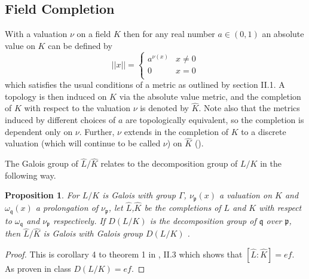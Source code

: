 \documentclass[paper=a4, fontsize=11pt]{scrartcl} %
\numberwithin{equation}{section} %
\numberwithin{figure}{section} %
\numberwithin{table}{section} %
\theoremstyle{break}
\newtheorem{prop}{Proposition}
\begin{document}
\subsection{Field Completion}
With a valuation $\nu$ on a field $K$ then for any real number $a\in(0,1)$ an absolute value on $K$ can be defined by
\[ ||x|| =  \begin{cases} 
      a^{\nu(x)} & x \not= 0 \\
      0 & x = 0 \\
   \end{cases}
\]
which satisfies the usual conditions of a metric as outlined by \cite{Serre} section II.1. A topology is then induced on $K$ via the absolute value metric, and the completion of $K$ with respect to the valuation $\nu$ is denoted by $\widehat{K}$. Note also that the metrics induced by different choices of $a$ are topologically equivalent, so the completion is dependent only on $\nu$. Further, $\nu$ extends in the completion of $K$ to a discrete valuation (which will continue to be called $\nu$) on $\widehat{K}$ (\cite{Serre}).

The Galois group of $\widehat{L}/\widehat{K}$ relates to the decomposition group of $L/K$ in the following way.
\begin{prop}
For $L/K$ is Galois with group $\Gamma$, $\nu_\mathfrak{p}(x)$ a valuation on $K$ and $\omega_\mathfrak{q}(x)$ a prolongation of $\nu_\mathfrak{p}$, let $\widehat{L}$,$\widehat{K}$ be the completions of $L$ and $K$ with respect to $\omega_\mathfrak{q}$ and $\nu_\mathfrak{p}$ respectively. If $D(L/K)$ is the decomposition group of $\mathfrak{q}$ over $\mathfrak{p}$, then $\widehat{L}/\widehat{K}$ is Galois with Galois group $D(L/K)$ \cite{Serre}.
\end{prop}
\begin{proof}
This is corollary 4 to theorem 1 in \cite{Serre}, II.3 which shows that $[\widehat{L}:\widehat{K}]=ef$. As proven in class $D(L/K)=ef$.
\end{proof}
\end{document}
